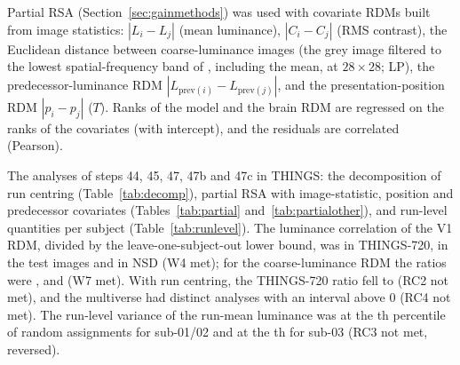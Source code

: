 Partial RSA (Section~\ref{sec:gainmethods}) was used with covariate RDMs built from image statistics:
$|L_i - L_j|$ (mean luminance), $|C_i - C_j|$ (RMS contrast), the Euclidean distance between
coarse-luminance images (the grey image filtered to the lowest spatial-frequency band of
\citet{evalres}, including the mean, at $28 \times 28$; LP), the predecessor-luminance RDM
$|L_{\mathrm{prev}(i)} - L_{\mathrm{prev}(j)}|$, and the presentation-position RDM $|p_i - p_j|$
($T$). Ranks of the model and the brain RDM are regressed on the ranks of the covariates (with
intercept), and the residuals are correlated (Pearson).

The analyses of steps 44, 45, 47, 47b and 47c in THINGS: the decomposition of run centring
(Table~\ref{tab:decomp}), partial RSA with image-statistic, position and predecessor covariates
(Tables~\ref{tab:partial} and~\ref{tab:partialother}), and run-level quantities per subject
(Table~\ref{tab:runlevel}). The luminance correlation of the V1 RDM, divided by the leave-one-subject-out
lower bound, was \LumRatioTsev{} in THINGS-720, \LumRatioTest{} in the test images and \LumRatioNsd{} in NSD
(W4 met); for the coarse-luminance RDM the ratios were \LpRatioTsev, \LpRatioTest{} and \LpRatioNsd{} (W7
met). With run centring, the THINGS-720 ratio fell to \LumBoundRc{} (RC2 not met), and the multiverse had
\RuleRcFour{} distinct analyses with an interval above 0 (RC4 not met). The run-level variance of the
run-mean luminance was at the \RunLumPctSubOneTwo{}th percentile of random assignments for sub-01/02 and at
the \RunLumPctSubThree{}th for sub-03 (RC3 not met, reversed).





